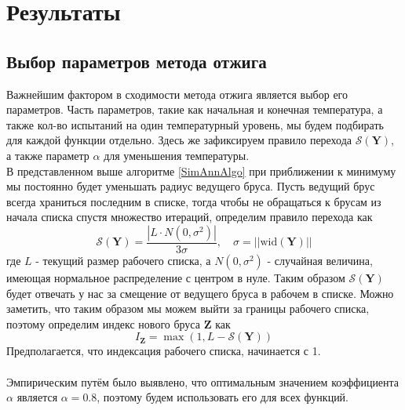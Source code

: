 \section{Результаты}
\subsection{Выбор параметров метода отжига}
Важнейшим фактором в сходимости метода отжига является выбор его параметров. Часть параметров, такие как начальная и конечная температура, а также кол-во испытаний на один температурный уровень, мы будем подбирать для каждой функции отдельно. Здесь же зафиксируем правило перехода $\mathcal{S}(\mathbf{Y})$, а также параметр $\alpha$ для уменьшения температуры.\\
В представленном выше алгоритме \eqref{SimAnnAlgo} при приближении к минимуму мы постоянно будет уменьшать радиус ведущего бруса. Пусть ведущий брус всегда храниться последним в списке, тогда чтобы не обращаться к брусам из начала списка спустя множество итераций, определим правило перехода как
\begin{equation}
    \mathcal{S}(\mathbf{Y})=\frac{|L\cdot N(0,\sigma^2)|}{3\sigma},\quad \sigma=||\mathrm{wid}(\mathbf{Y})||
\end{equation}
где $L$ - текущий размер рабочего списка, а $N(0,\sigma^2)$ - случайная величина, имеющая нормальное распределение с центром в нуле.
Таким образом $\mathcal{S}(\mathbf{Y})$ будет отвечать у нас за смещение от ведущего бруса в рабочем в списке. Можно заметить, что таким образом мы можем выйти за границы рабочего списка, поэтому определим индекс нового бруса $\mathbf{Z}$ как
\begin{equation}
    I_{\mathbf{Z}}=\max(1, L - \mathcal{S}(\mathbf{Y}))
\end{equation}
Предполагается, что индексация рабочего списка, начинается с 1.\\\\
Эмпирическим путём было выявлено, что оптимальным значением коэффициента $\alpha$ является $\alpha=0.8$, поэтому будем использовать его для всех функций.
